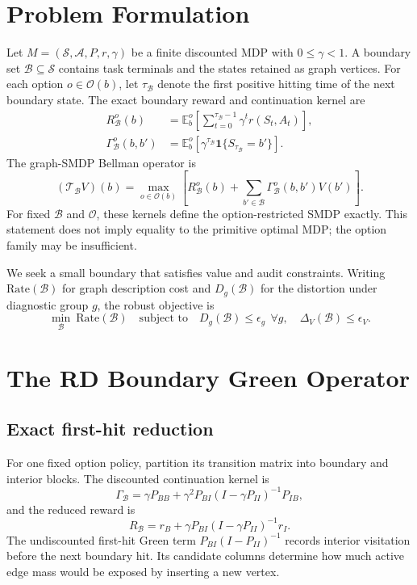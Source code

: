 \documentclass[10pt]{article}
\newcommand{\B}{\mathcal{B}}
\newcommand{\Oset}{\mathcal{O}}
\newcommand{\T}{\mathcal{T}}
\begin{document}
\section{Problem Formulation}
Let $M=(\mathcal{S},\mathcal{A},P,r,\gamma)$ be a finite discounted MDP with
$0\leq\gamma<1$. A boundary set $\B\subseteq\mathcal{S}$ contains task
terminals and the states retained as graph vertices. For each option
$o\in\Oset(b)$, let $\tau_\B$ denote the first positive hitting time of the
next boundary state. The exact boundary reward and continuation kernel are
\begin{align}
R^o_\B(b) &= \mathbb{E}_b^o\left[\sum_{t=0}^{\tau_\B-1}\gamma^t
r(S_t,A_t)\right],\\
\Gamma^o_\B(b,b') &= \mathbb{E}_b^o\left[\gamma^{\tau_\B}
\mathbf{1}\{S_{\tau_\B}=b'\}\right].
\end{align}
The graph-SMDP Bellman operator is
\begin{equation}
(\T_\B V)(b)=\max_{o\in\Oset(b)}\left[R^o_\B(b)+
\sum_{b'\in\B}\Gamma^o_\B(b,b')V(b')\right].
\end{equation}
For fixed $\B$ and $\Oset$, these kernels define the option-restricted SMDP
exactly. This statement does not imply equality to the primitive optimal MDP;
the option family may be insufficient.

We seek a small boundary that satisfies value and audit constraints. Writing
$\mathrm{Rate}(\B)$ for graph description cost and $D_g(\B)$ for the
distortion under diagnostic group $g$, the robust objective is
\begin{equation}
\min_{\B}\ \mathrm{Rate}(\B)\quad
\text{subject to}\quad D_g(\B)\leq\epsilon_g\ \ \forall g,
\quad \Delta_V(\B)\leq\epsilon_V.
\end{equation}

\section{The RD Boundary Green Operator}
\subsection{Exact first-hit reduction}
For one fixed option policy, partition its transition matrix into boundary and
interior blocks. The discounted continuation kernel is
\begin{equation}
\Gamma_\B=\gamma P_{BB}+\gamma^2P_{BI}
(I-\gamma P_{II})^{-1}P_{IB},
\end{equation}
and the reduced reward is
\begin{equation}
R_\B=r_B+\gamma P_{BI}(I-\gamma P_{II})^{-1}r_I.
\end{equation}
The undiscounted first-hit Green term
$P_{BI}(I-P_{II})^{-1}$ records interior visitation before the next boundary
hit. Its candidate columns determine how much active edge mass would be exposed
by inserting a new vertex.
\end{document}
